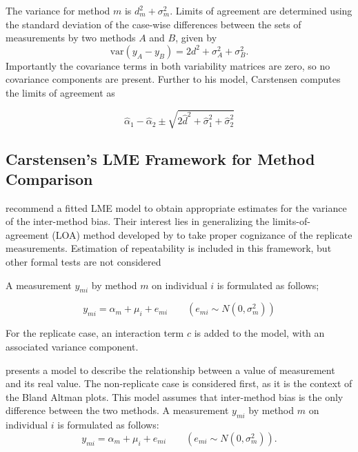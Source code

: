 \documentclass[12pt, a4paper]{report}
\theoremstyle{plain}
\theoremstyle{definition}
\theoremstyle{remark}
\begin{document}
The variance for method $m$ is $d^2_{m}+\sigma^2_{m}$. Limits of agreement are determined using the standard deviation of the case-wise differences between the sets of measurements by two methods $A$ and $B$, given by
\begin{equation}
\mbox{var} (y_{A}-y_{B}) = 2d^2 + \sigma^2_{A}+ \sigma^2_{B}.
\end{equation}
Importantly the covariance terms in both variability matrices are zero, so no covariance components are present. Further to his model, Carstensen computes the limits of agreement
as

\[
\hat{\alpha}_1 - \hat{\alpha}_2 \pm \sqrt{2 \hat{d}^2 + 	\hat{\sigma}^2_1 + \hat{\sigma}^2_2}
\]






\subsection{Carstensen's LME Framework for Method Comparison}



%
\citet{BXC2008} recommend a fitted LME model to obtain appropriate estimates for the variance of the inter-method bias. Their interest lies in generalizing the limits-of-agreement (LOA) method developed by \citet{BA86} to take proper cognizance of the replicate measurements.  Estimation of repeatability is included in this framework, but other formal tests are not considered

A measurement $y_{mi}$ by method $m$ on individual $i$ is
formulated as follows;

\begin{equation}
y_{mi}  = \alpha_{m} + \mu_{i} + e_{mi} \qquad ( e_{mi} \sim
N(0,\sigma^{2}_{m}))
\end{equation}




For the
replicate case, an interaction term $c$ is added to the model,
with an associated variance component. 

\citet{BXC2004} presents a model to describe the relationship between a value of measurement and its real value. The non-replicate case is considered first, as it is the context of the Bland Altman plots. This model assumes that inter-method bias is the only difference between the two methods. A measurement $y_{mi}$ by method $m$ on individual $i$ is formulated as follows:
\begin{equation}
y_{mi}  = \alpha_{m} + \mu_{i} + e_{mi} \qquad ( e_{mi} \sim
N(0,\sigma^{2}_{m})).
\end{equation}
\end{document}

